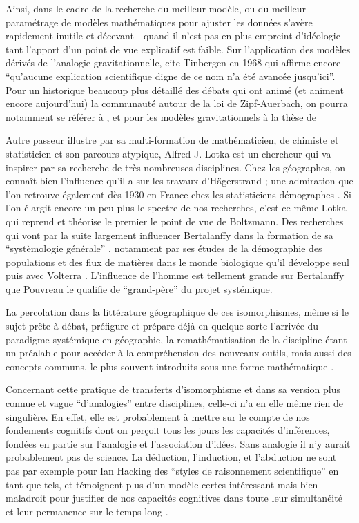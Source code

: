 Ainsi, dans le cadre de la recherche du meilleur modèle, ou du meilleur paramétrage de modèles mathématiques pour ajuster les données s'avère rapidement inutile et décevant - quand il n'est pas en plus empreint d'idéologie - tant l'apport d'un point de vue explicatif est faible. Sur l'application des modèles dérivés de l'analogie gravitationnelle, \textcite[37]{Pumain1982} cite Tinbergen en 1968 qui affirme encore \enquote{qu'aucune explication scientifique digne de ce nom n'a été avancée jusqu'ici}. Pour un historique beaucoup plus détaillé des débats qui ont animé (et animent encore aujourd'hui) la communauté autour de la loi de Zipf-Auerbach, on pourra notamment se référer à \textcite{Pumain1982,Pumain2012}, et pour les modèles gravitationnels à la thèse de \textcite{JensenButler1970} %

Autre passeur illustre par sa multi-formation de mathématicien, de chimiste et statisticien et son parcours atypique, Alfred J. Lotka est un chercheur qui va inspirer par sa recherche de très nombreuses disciplines. Chez les géographes, on connaît bien l'influence qu'il a sur les travaux d'Hägerstrand \autocite[95]{Claval2007}; une admiration que l'on retrouve également dès 1930 en France chez les statisticiens démographes \autocite{Veron2009}. Si l'on élargit encore un peu plus le spectre de nos recherches, c'est ce même Lotka qui reprend et théorise le premier le point de vue de Boltzmann. Des recherches qui vont par la suite largement influencer Bertalanffy dans la formation de sa \enquote{systèmologie générale} \autocite[178]{Pouvreau2013}, notamment par ses études de la démographie des populations et des flux de matières dans le monde biologique qu'il développe seul puis avec Volterra \autocite[545-546]{Pouvreau2013}. L'influence de l'homme est tellement grande sur Bertalanffy que Pouvreau le qualifie de \enquote{grand-père} du projet systémique.

La percolation dans la littérature géographique de ces isomorphismes, même si le sujet prête à débat, préfigure et prépare déjà en quelque sorte l'arrivée du paradigme systémique en géographie, la remathématisation de la discipline étant un préalable pour accéder à la compréhension des nouveaux outils, mais aussi des concepts communs, le plus souvent introduits sous une forme mathématique \autocite[432]{Ackerman1963}.

Concernant cette pratique de transferts d'isomorphisme et dans sa version plus connue et vague \enquote{d'analogies} entre disciplines, celle-ci n'a en elle même rien de singulière. En effet, elle est probablement à mettre sur le compte de nos fondements cognitifs dont on perçoit tous les jours les capacités d'inférences, fondées en partie sur l’analogie et l'association d'idées. Sans analogie il n'y aurait probablement pas de science. La déduction, l'induction, et l'abduction ne sont pas par exemple pour Ian Hacking des \enquote{styles de raisonnement scientifique}  en tant que tels, et témoignent plus d'un modèle certes intéressant mais bien maladroit pour justifier de nos capacités cognitives dans toute leur simultanéité et leur permanence sur le temps long \autocite[98]{Hacking1989}.

